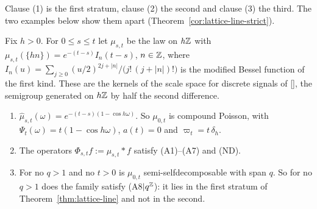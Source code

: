 Clause (1) is the first stratum, clause (2) the second and clause (3) the third. The two examples
below show them apart (Theorem~\ref{cor:lattice-line-strict}).

\begin{proposition}
\label{prop:lindeberg-stratum-one}
\leanok
Fix $h > 0$. For $0 \le s \le t$ let $\mu_{s,t}$ be the law on $h\mathbb{Z}$ with
$\mu_{s,t}(\{hn\}) = e^{-(t-s)}I_n(t-s)$, $n \in \mathbb{Z}$, where
$I_n(u) = \sum_{j \ge 0}(u/2)^{2j+|n|}/\bigl(j!\,(j+|n|)!\bigr)$ is the modified Bessel function of
the first kind. These are the kernels of the scale space for discrete signals of
[], the semigroup generated on $h\mathbb{Z}$ by half the second difference.
\begin{enumerate}
\item $\widehat\mu_{s,t}(\omega) = e^{-(t-s)(1 - \cos h\omega)}$. So $\mu_{0,t}$ is compound
Poisson, with $\Psi_t(\omega) = t(1 - \cos h\omega)$, $a(t) = 0$ and $\varpi_t = t\,\delta_h$.
\item The operators $\Phi_{s,t}f := \mu_{s,t} * f$ satisfy (A1)--(A7) and (ND).
\item For no $q > 1$ and no $t > 0$ is $\mu_{0,t}$ semi-selfdecomposable with span $q$. So for no
$q > 1$ does the family satisfy (A8$|q^{\mathbb{Z}}$): it lies in the first stratum of
Theorem~\ref{thm:lattice-line} and not in the second.

\end{enumerate}
\end{proposition}
